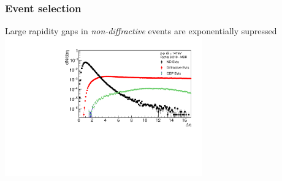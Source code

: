 \documentclass{beamer}
\begin{document}

\begin{frame}
    \frametitle{Event selection}
    Large rapidity gaps in \emph{non-diffractive} events are exponentially supressed
    \centering\includegraphics[height=6cm,keepaspectratio]{pics/newDeltaEta_biggerSymbols.pdf}
\end{frame}

\end{document}
